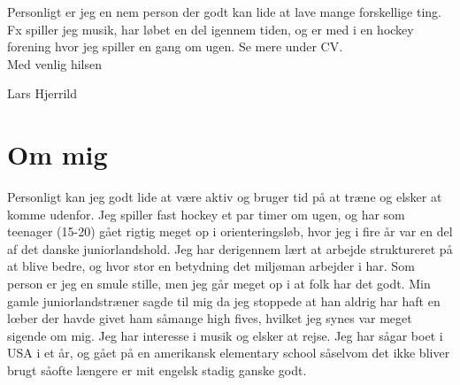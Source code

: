 \documentclass[11pt,a4paper,sans]{moderncv} %
\begin{document}
Personligt er jeg en nem person der godt kan lide at lave mange forskellige ting. Fx spiller jeg musik, har l\o bet en del igennem tiden, og er med i en hockey forening hvor jeg spiller en gang om ugen. Se mere under CV.\\ 








\vspace{3mm}
Med venlig hilsen

\vspace{5mm}
Lars Hjerrild



\vspace{10mm}







\newpage


\makecvtitle %


\section{Om mig}
Personligt kan jeg godt lide at v\ae re aktiv og bruger tid p{\aa} at tr\ae ne og elsker at komme udenfor. Jeg spiller fast hockey et par timer om ugen, og har som teenager (15-20) g\aa et rigtig meget op i orienteringsl\o b, hvor jeg i fire \aa r var en del af det danske juniorlandshold. Jeg har derigennem l\ae rt  at arbejde struktureret p{\aa} at blive bedre, og hvor stor en betydning det milj\o man arbejder i har. Som person er jeg en smule stille, men jeg g\aa r meget op i at folk har det godt. Min gamle juniorlandstr\ae ner sagde til mig da jeg stoppede at han aldrig har haft en l\oe ber der havde givet ham s\aa mange high fives, hvilket jeg synes var meget sigende om mig. Jeg har interesse i musik og elsker at rejse. Jeg har s\aa gar boet i USA i et \aa r, og g\aa et p{\aa} en amerikansk elementary school s\aa selvom det ikke bliver brugt s\aa ofte l\ae ngere er mit engelsk stadig ganske godt. 
\end{document}
